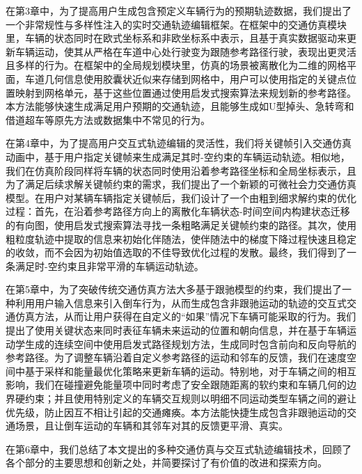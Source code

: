 在第3章中，为了提高用户生成包含预定义车辆行为的预期轨迹数据，我们提出了一个非常规性与多样性注入的实时交通轨迹编辑框架。在框架中的交通仿真模块里，车辆的状态同时在欧式坐标系和非欧坐标系中表示，且基于真实数据驱动来更新车辆运动，使其从严格在车道中心处行驶变为跟随参考路径行驶，表现出更灵活且多样的行为。在框架中的全局规划模块里，仿真的场景被离散化为二维的网格平面，车道几何信息使用胶囊状近似来存储到网格中，用户可以使用指定的关键点位置映射到网格单元，基于这些位置通过使用启发式搜索算法来规划新的参考路径。本方法能够快速生成满足用户预期的交通轨迹，且能够生成如U型掉头、急转弯和借道超车等原先方法或数据集中不常见的行为。

在第4章中，为了提高用户交互式轨迹编辑的灵活性，我们将关键帧引入交通仿真动画中，基于用户指定关键帧来生成满足其时-空约束的车辆运动轨迹。相似地，我们在仿真阶段同样将车辆的状态同时使用沿着参考路径坐标和全局坐标表示，且为了满足后续求解关键帧约束的需求，我们提出了一个新颖的可微社会力交通仿真模型。在用户对某辆车辆指定关键帧后，我们设计了一个由粗到细求解约束的优化过程：首先，在沿着参考路径方向上的离散化车辆状态-时间空间内构建状态迁移的有向图，使用启发式搜索算法寻找一条粗略满足关键帧约束的路径。其次，使用粗粒度轨迹中提取的信息来初始化伴随法，使伴随法中的梯度下降过程快速且稳定的收敛，而不会因为初始值选取的不佳导致优化过程的发散。最终，我们得到了一条满足时-空约束且非常平滑的车辆运动轨迹。

在第5章中，为了突破传统交通仿真方法大多基于跟驰模型的约束，我们提出了一种利用用户输入信息来引入倒车行为，从而生成包含非跟驰运动的轨迹的交互式交通仿真方法，从而让用户获得在自定义的“如果”情况下车辆可能采取的行为。我们提出了使用关键状态来同时表征车辆未来运动的位置和朝向信息，并在基于车辆运动学生成的连续空间中使用启发式路径规划方法，生成同时包含前向和反向导航的参考路径。为了调整车辆沿着自定义参考路径的运动和邻车的反馈，我们在速度空间中基于采样和能量最优化策略来更新车辆的运动。特别地，对于车辆之间的相互影响，我们在碰撞避免能量项中同时考虑了安全跟随距离的软约束和车辆几何的边界硬约束；并且使用特别定义的车辆交互规则以明细不同运动类型车辆之间的避让优先级，防止因互不相让引起的交通瘫痪。本方法能快捷生成包含非跟驰运动的交通场景，且让倒车运动的车辆和其邻车对其的反馈更平滑、真实。

在第6章中，我们总结了本文提出的多种交通仿真与交互式轨迹编辑技术，回顾了各个部分的主要思想和创新之处，并简要探讨了有价值的改进和探索方向。


